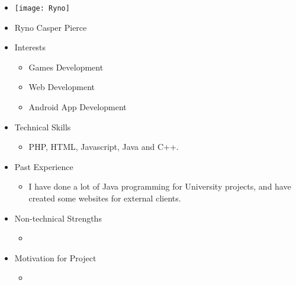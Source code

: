 
\begin{itemize}
	\item[] \texttt{[image: Ryno]}
	\item[] Ryno Casper Pierce
	\item Interests
	\begin{itemize}
		\item Games Development
		\item Web Development
		\item Android App Development
	\end{itemize}
	\item Technical Skills
	\begin{itemize}
		\item[] PHP, HTML, Javascript, Java and C++.
	\end{itemize}
	\item Past Experience
	\begin{itemize}
		\item[] I have done a lot of Java programming for University projects, and have created some websites for external clients.
	\end{itemize}
	\item Non-technical Strengths
	\begin{itemize}
		\item[] 
	\end{itemize}
	\item Motivation for Project
	\begin{itemize}
		\item[] 
	\end{itemize}
\end{itemize}